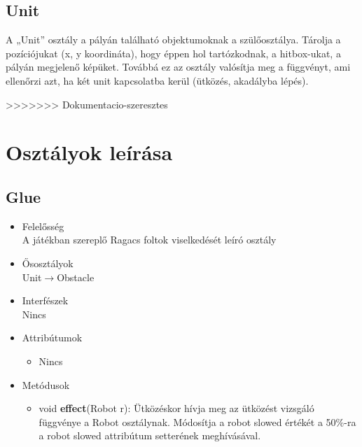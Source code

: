 \subsection{Unit}
A „Unit” osztály a pályán található objektumoknak a szülőosztálya. Tárolja a pozíciójukat (x, y koordináta), hogy éppen hol tartózkodnak, a hitbox-ukat, a pályán megjelenő képüket. Továbbá ez az osztály valósítja meg a függvényt, ami ellenőrzi azt, ha két unit kapcsolatba kerül (ütközés, akadályba lépés).

>>>>>>> Dokumentacio-szeresztes

\section{Osztályok leírása}

\subsection{Glue}
\begin{itemize}
\item Felelősség\\
A játékban szereplő Ragacs foltok viselkedését leíró osztály
\item Ősosztályok\\
Unit$\rightarrow$Obstacle
\item Interfészek\\
Nincs
\item Attribútumok
	\begin{itemize}
	   \item  Nincs
\end{itemize}
\item Metódusok
	\begin{itemize}
		\item void \textbf{effect}(Robot r): Ütközéskor hívja meg az ütközést vizsgáló függvénye a Robot osztálynak. Módosítja a robot slowed értékét a 50\%-ra a robot slowed attribútum setterének meghívásával.
	\end{itemize}
\end{itemize}

